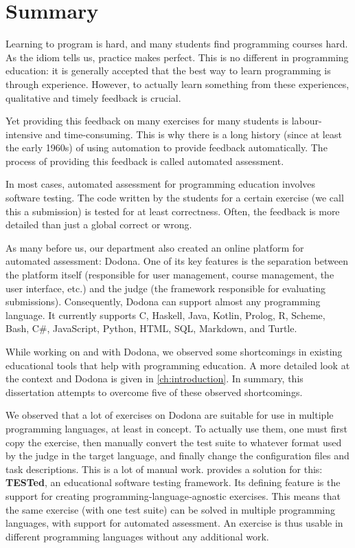 \documentclass[main]{subfiles}
\begin{document}
\chapter*{Summary}\label{ch:summary}

Learning to program is hard, and many students find programming courses hard.
As the idiom tells us, practice makes perfect.
This is no different in programming education: it is generally accepted that the best way to learn programming is through experience.
However, to actually learn something from these experiences, qualitative and timely feedback is crucial.

Yet providing this feedback on many exercises for many students is labour-intensive and time-consuming.
This is why there is a long history (since at least the early 1960s) of using automation to provide feedback automatically.
The process of providing this feedback is called automated assessment.

In most cases, automated assessment for programming education involves software testing.
The code written by the students for a certain exercise (we call this a submission) is tested for at least correctness.
Often, the feedback is more detailed than just a global correct or wrong.

As many before us, our department also created an online platform for automated assessment: Dodona.
One of its key features is the separation between the platform itself (responsible for user management, course management, the user interface, etc.) and the judge (the framework responsible for evaluating submissions).
Consequently, Dodona can support almost any programming language.
It currently supports C, Haskell, Java, Kotlin, Prolog, R, Scheme, Bash, C\#, JavaScript, Python, HTML, SQL, Markdown, and Turtle.

While working on and with Dodona, we observed some shortcomings in existing educational tools that help with programming education.
A more detailed look at the context and Dodona is given in \cref{ch:introduction}.
In summary, this dissertation attempts to overcome five of these observed shortcomings.

We observed that a lot of exercises on Dodona are suitable for use in multiple programming languages, at least in concept.
To actually use them, one must first copy the exercise, then manually convert the test suite to whatever format used by the judge in the target language, and finally change the configuration files and task descriptions.
This is a lot of manual work.
 provides a solution for this: \textbf{TESTed}, an educational software testing framework.
Its defining feature is the support for creating programming‐language‐agnostic exercises.
This means that the same exercise (with one test suite) can be solved in multiple programming languages, with support for automated assessment.
An exercise is thus usable in different programming languages without any additional work.
\end{document}
